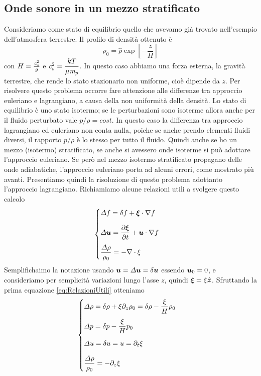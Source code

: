 \subsection{Onde sonore in un mezzo stratificato}
Consideriamo come stato di equilibrio quello che avevamo già trovato nell'esempio dell'atmosfera terrestre. Il profilo di densità ottenuto è
\begin{equation}
\rho_0 = \hat{\rho} \exp \left[-\dfrac{z}{H} \right]
\end{equation}
con $H=\frac{\textit{c}_{s}^2}{g}$ e $\textit{c}_{s}^2=\dfrac{kT}{\mu \textit{m}_{p}}$. In questo caso abbiamo una forza esterna, la gravità terrestre, che rende lo stato stazionario non uniforme, cioè dipende da $z$. Per risolvere questo problema occorre fare attenzione alle differenze tra approccio euleriano e lagrangiano, a causa della non uniformità della densità. Lo stato di equilibrio è uno stato isotermo; se le perturbazioni sono isoterme allora anche per il fluido perturbato vale $p/\rho=cost$. In questo caso la differenza tra approccio lagrangiano ed euleriano non conta nulla, poiche se anche prendo elementi fluidi diversi, il rapporto $p/\rho$ è lo stesso per tutto il fluido. Quindi anche se ho un mezzo (isotermo) stratificato, se anche si avessero onde isoterme si può adottare l'approccio euleriano. Se però nel mezzo isotermo stratificato propagano delle onde adiabatiche, l'approccio euleriano porta ad alcuni errori, come mostrato più avanti. Presentiamo quindi la risoluzione di questo problema adottanto l'approccio lagrangiano. Richiamiamo alcune relazioni utili a svolgere questo calcolo
\begin{equation}
\begin{cases}
\Delta f = \delta f + \scal{\xi}{\nabla}f \\[10pt]		\label{eq:RelazioniUtili}
\Delta \V{u} = \derP{\V{\xi}}{t} + \scal{u}{\nabla}f \\[10pt]
\dfrac{\Delta \rho}{\rho_0} = -\Div\V{\xi}
\end{cases}
\end{equation}
Semplifichaimo la notazione usando $\V{u}=\Delta\V{u}=\delta\V{u}$ essendo $\V{u}_0=0$, e consideriamo per semplicità variazioni lungo l'asse $z$, quindi $\V{\xi}=\xi \V{\hat{z}}$. Sfruttando la prima equazione \ref{eq:RelazioniUtili} otteniamo
\begin{equation}
\begin{cases}
\Delta \rho = \delta\rho + \xi \partial_z \rho_0 = \delta \rho - \dfrac{\xi}{H}\rho_0 \\[10pt]		
\Delta p = \delta p -\dfrac{\xi}{H} p_0 \\[10pt]
\Delta u = \delta u = u = \partial_t \xi \\[10pt]
\dfrac{\Delta \rho}{\rho_0} = -\partial_z \xi
\end{cases}
\end{equation}
